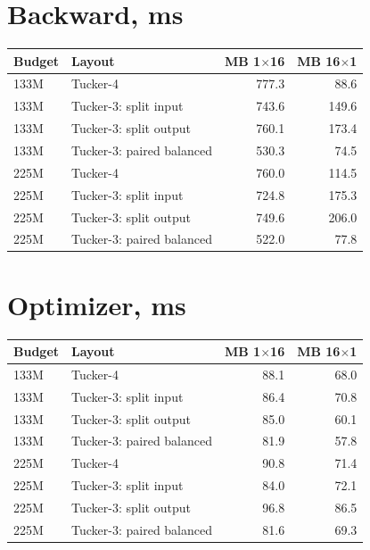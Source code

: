 \documentclass[10pt]{article}
\begin{document}
\section{Backward, ms}
\begin{center}
\small
\begin{tabular}{llrr}
\toprule
\textbf{Budget} & \textbf{Layout} & \textbf{MB 1$\times$16} & \textbf{MB 16$\times$1} \\
\midrule
133M & Tucker-4 & 777.3 & 88.6 \\
133M & Tucker-3: split input & 743.6 & 149.6 \\
133M & Tucker-3: split output & 760.1 & 173.4 \\
133M & Tucker-3: paired balanced & 530.3 & 74.5 \\
225M & Tucker-4 & 760.0 & 114.5 \\
225M & Tucker-3: split input & 724.8 & 175.3 \\
225M & Tucker-3: split output & 749.6 & 206.0 \\
225M & Tucker-3: paired balanced & 522.0 & 77.8 \\
\bottomrule
\end{tabular}
\end{center}
\section{Optimizer, ms}
\begin{center}
\small
\begin{tabular}{llrr}
\toprule
\textbf{Budget} & \textbf{Layout} & \textbf{MB 1$\times$16} & \textbf{MB 16$\times$1} \\
\midrule
133M & Tucker-4 & 88.1 & 68.0 \\
133M & Tucker-3: split input & 86.4 & 70.8 \\
133M & Tucker-3: split output & 85.0 & 60.1 \\
133M & Tucker-3: paired balanced & 81.9 & 57.8 \\
225M & Tucker-4 & 90.8 & 71.4 \\
225M & Tucker-3: split input & 84.0 & 72.1 \\
225M & Tucker-3: split output & 96.8 & 86.5 \\
225M & Tucker-3: paired balanced & 81.6 & 69.3 \\
\bottomrule
\end{tabular}
\end{center}
\end{document}
